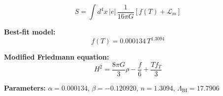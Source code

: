 
\begin{equation}
  S = \int d^4x \, |e| \, \frac{1}{16\pi G} \left[ f(T) + \mathcal{L}_m \right]
\end{equation}

\textbf{Best-fit model:}
\begin{equation}
  f(T) = 0.000134 \, T^{1.3094}
\end{equation}

\textbf{Modified Friedmann equation:}
\begin{equation}
  H^2 = \frac{8\pi G}{3} \rho - \frac{f}{6} + \frac{T f_T}{3}
\end{equation}

\textbf{Parameters:}
$\alpha = 0.000134$, \quad
$\beta = -0.120920$, \quad
$n = 1.3094$, \quad
$\Lambda_{\text{BI}} = 17.7906$